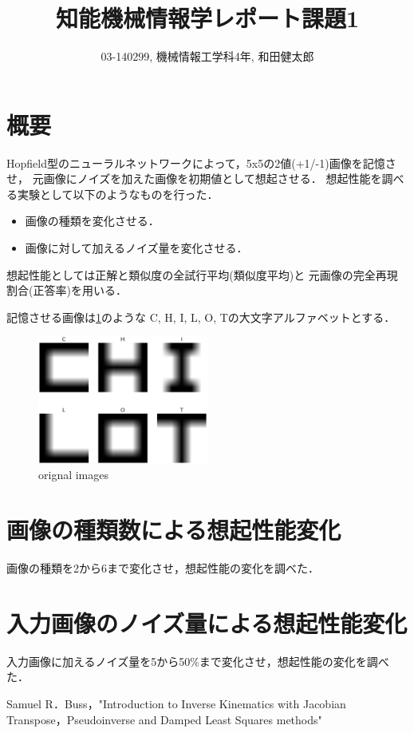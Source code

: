 \documentclass[10pt,twocolumn]{jarticle}
\title{知能機械情報学レポート課題1}
\author{03-140299, 機械情報工学科4年, 和田健太郎}
\newcommand{\figref}[1]{\figurename\ref{fig:#1}}
\begin{document}
\maketitle


\section{概要}
Hopfield型のニューラルネットワークによって，5x5の2値(+1/-1)画像を記憶させ，
元画像にノイズを加えた画像を初期値として想起させる．
想起性能を調べる実験として以下のようなものを行った．
\begin{itemize}
  \item 画像の種類を変化させる．
  \item 画像に対して加えるノイズ量を変化させる．
\end{itemize}

想起性能としては正解と類似度の全試行平均(類似度平均)と
元画像の完全再現割合(正答率)を用いる．

記憶させる画像は\figref{original-images}のような
C, H, I, L, O, Tの大文字アルファベットとする．
\begin{figure}[htbp]
  \centering
    \includegraphics[width=0.5\textwidth]{figs/alphabet_images}
    \caption{orignal images}
  \label{fig:original-images}
\end{figure}


\section{画像の種類数による想起性能変化}
画像の種類を2から6まで変化させ，想起性能の変化を調べた．


\section{入力画像のノイズ量による想起性能変化}
入力画像に加えるノイズ量を5から50\%まで変化させ，想起性能の変化を調べた．


\begin{thebibliography}{9}
   Samuel R．Buss，"Introduction to Inverse Kinematics with Jacobian Transpose，Pseudoinverse and Damped Least Squares methods"
\end{thebibliography}
\end{document}
